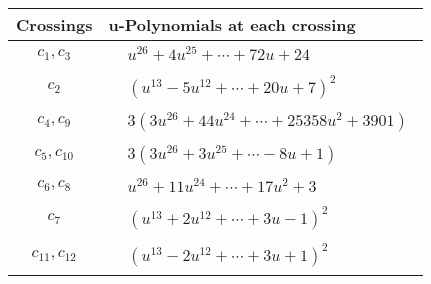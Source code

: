 \documentclass[1p]{elsarticle_modified}
\theoremstyle{definition}
\begin{document}
\begin{tabular}{m{50pt}|m{274pt}}
Crossings & \hspace{64pt}u-Polynomials at each crossing \\
\hline $$\begin{aligned}c_{1},c_{3}\end{aligned}$$&$\begin{aligned}
&u^{26}+4 u^{25}+\cdots+72 u+24
\end{aligned}$\\
\hline $$\begin{aligned}c_{2}\end{aligned}$$&$\begin{aligned}
&(u^{13}-5 u^{12}+\cdots+20 u+7)^{2}
\end{aligned}$\\
\hline $$\begin{aligned}c_{4},c_{9}\end{aligned}$$&$\begin{aligned}
&3(3 u^{26}+44 u^{24}+\cdots+25358 u^2+3901)
\end{aligned}$\\
\hline $$\begin{aligned}c_{5},c_{10}\end{aligned}$$&$\begin{aligned}
&3(3 u^{26}+3 u^{25}+\cdots-8 u+1)
\end{aligned}$\\
\hline $$\begin{aligned}c_{6},c_{8}\end{aligned}$$&$\begin{aligned}
&u^{26}+11 u^{24}+\cdots+17 u^2+3
\end{aligned}$\\
\hline $$\begin{aligned}c_{7}\end{aligned}$$&$\begin{aligned}
&(u^{13}+2 u^{12}+\cdots+3 u-1)^{2}
\end{aligned}$\\
\hline $$\begin{aligned}c_{11},c_{12}\end{aligned}$$&$\begin{aligned}
&(u^{13}-2 u^{12}+\cdots+3 u+1)^{2}
\end{aligned}$\\
\hline
\end{tabular}\\~\\
\end{document}
